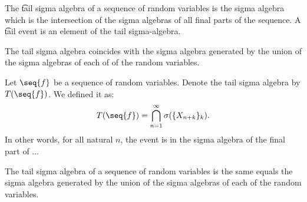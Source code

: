 


The \t{tail sigma algebra} of a sequence of random variables is the sigma algebra which is the intersection of the sigma algebras of all final parts of the sequence.
A \t{tail event} is an element of the tail sigma-algebra.

The tail sigma algebra coincides with the sigma algebra generated by the union of the sigma algebras of each of of the random variables.


Let $\seq{f}$ be a sequence of random variables.
Denote the tail sigma algebra by $T(\seq{f})$.
We defined it as:
  \[
T(\seq{f}) = \bintersection_{n = 1}^{\infty} \sigma(\set{X_{n+k}}_k).
  \]
In other words, for all natural $n$, the event is in the sigma algebra of the final part of ...


\begin{proposition}
The tail sigma algebra of
a sequence of random variables
is the same equals the sigma
algebra generated by
the union of the sigma algebras
of each of the random variables.
\end{proposition}

\blankpage
